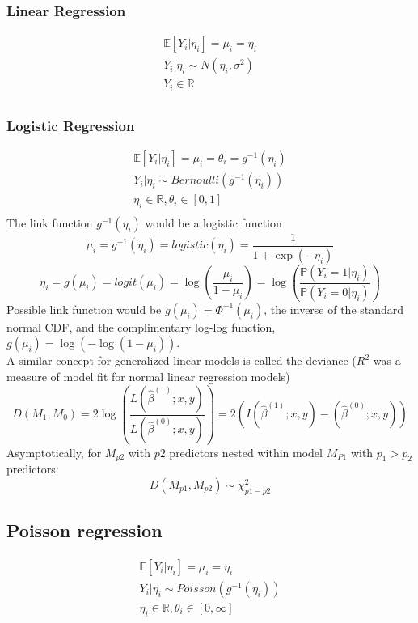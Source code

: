 \documentclass[12pt,a4paper]{article}
\begin{document}
\subsubsection*{Linear Regression}
\begin{eqnarray*}
\mathbb{E}[Y_i|\eta_i] = \mu_i=\eta_i \\
Y_i|\eta_i \sim N(\eta_i,\sigma^2) \\
Y_i \in \mathbb{R} \\
\end{eqnarray*}
\subsubsection*{Logistic Regression}
\begin{eqnarray*}
\mathbb{E}[Y_i|\eta_i] = \mu_i=\theta_i = g^{-1}(\eta_i) \\
Y_i|\eta_i \sim Bernoulli(g^{-1}(\eta_i))\\
\eta_i \in \mathbb{R}, \theta_i\in[0,1] \\
\end{eqnarray*}
The link function $g^{-1}(\eta_i)$ would be a logistic function
$$
\mu_i = g^{-1}(\eta_i)=logistic(\eta_i) = \frac{1}{1+\exp(-\eta_i)}
$$
$$
\eta_i = g(\mu_i) = logit(\mu_i) = \log (\frac{\mu_i}{1-\mu_i}) = \log(\frac{\mathbb{P}(Y_i=1|\eta_i)}{\mathbb{P}(Y_i=0|\eta_i)})
$$
Possible link function would be $g(\mu_i) = \Phi^{-1}(\mu_i)$, the inverse of the standard normal CDF, and the complimentary log-log function, $g(\mu_i) = \log(-\log(1-\mu_i))$. \\
A similar concept for generalized linear models is called the deviance ($R^2$ was a measure of model fit for normal linear regression models) \\
$$
D(M_1,M_0) = 2 \log(\frac{L(\hat \beta^{(1)};x,y)}{L(\hat \beta^{(0)};x,y)}) = 2(I(\hat \beta^{(1)};x,y)- (\hat \beta^{(0)};x,y))
$$
Asymptotically, for $M_{p2}$ with $p2$ predictors nested within model $M_{P1}$ with $p_1 > p_2$ predictors:
$$
D(M_{p1},M_{p2}) \sim \chi^2_{p1-p2}
$$
\subsection*{Poisson regression}
\begin{eqnarray*}
\mathbb{E}[Y_i|\eta_i] = \mu_i=\eta_i \\
Y_i|\eta_i \sim Poisson(g^{-1}(\eta_i))\\
\eta_i \in \mathbb{R}, \theta_i\in[0,\infty] \\
\end{eqnarray*}
\end{document}

